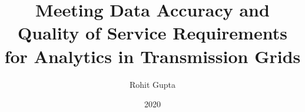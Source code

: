 

\clearpage{}  %



\title{Meeting Data Accuracy and Quality of Service Requirements for Analytics in Transmission Grids}
\author{Rohit Gupta}
\date{2020}



\thesis



\maketitle


